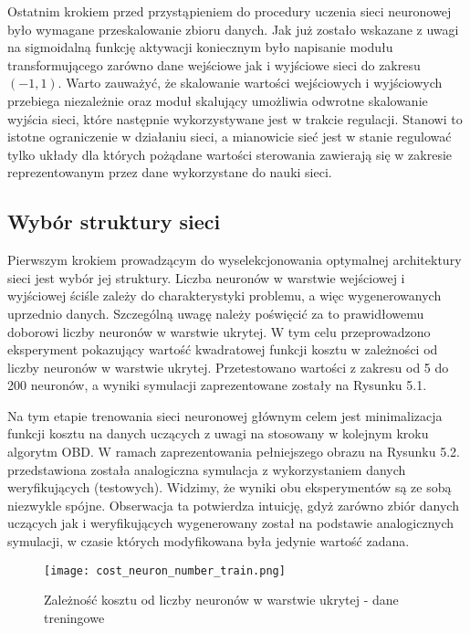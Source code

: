\par Ostatnim krokiem przed przystąpieniem do procedury uczenia sieci neuronowej było wymagane przeskalowanie zbioru danych. Jak już zostało wskazane z uwagi na sigmoidalną funkcję aktywacji koniecznym było napisanie modułu transformującego  zarówno dane wejściowe jak i wyjściowe sieci do zakresu \( (-1,1) \). Warto zauważyć, że skalowanie wartości wejściowych i wyjściowych przebiega niezależnie oraz moduł skalujący umożliwia odwrotne skalowanie wyjścia sieci, które następnie wykorzystywane jest w trakcie regulacji. Stanowi to istotne ograniczenie w działaniu sieci, a mianowicie sieć jest w stanie regulować tylko układy dla których pożądane wartości sterowania zawierają się w zakresie reprezentowanym przez dane wykorzystane do nauki sieci.  

\subsection{Wybór struktury sieci}
Pierwszym krokiem prowadzącym do wyselekcjonowania optymalnej architektury sieci jest wybór jej struktury. Liczba neuronów w warstwie wejściowej i wyjściowej ściśle zależy do charakterystyki problemu, a więc wygenerowanych uprzednio danych. Szczególną uwagę należy poświęcić za to prawidłowemu doborowi liczby neuronów w warstwie ukrytej. W tym celu przeprowadzono eksperyment pokazujący wartość kwadratowej funkcji kosztu w zależności od liczby neuronów w warstwie ukrytej. Przetestowano wartości z zakresu od 5 do 200 neuronów, a wyniki symulacji zaprezentowane zostały na Rysunku 5.1. 
\par Na tym etapie trenowania sieci neuronowej głównym celem jest minimalizacja funkcji kosztu na danych uczących z uwagi na  stosowany w kolejnym kroku algorytm OBD. W ramach zaprezentowania pełniejszego obrazu na Rysunku 5.2. przedstawiona została analogiczna symulacja z wykorzystaniem danych weryfikujących (testowych). Widzimy, że wyniki obu eksperymentów są ze sobą niezwykle spójne. Obserwacja ta potwierdza intuicję, gdyż zarówno zbiór danych uczących jak i weryfikujących wygenerowany został na podstawie analogicznych symulacji, w czasie których modyfikowana była jedynie wartość zadana. 

\begin{figure}[!h]
  \label{fig:Koszt-liczba-neuronow-treningowe}
  \centering \texttt{[image: cost\_neuron\_number\_train.png]}
  \caption{Zależność kosztu od liczby neuronów w warstwie ukrytej - dane treningowe}
\end{figure}

